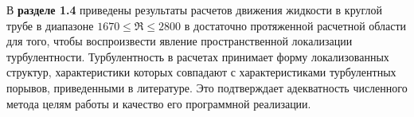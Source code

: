 В \textbf{разделе 1.4} приведены результаты расчетов движения жидкости в круглой трубе в диапазоне $1670 \leqslant \Re \leqslant 2800$ в достаточно протяженной расчетной области для того, чтобы воспроизвести явление пространственной локализации турбулентности. Турбулентность в расчетах принимает форму локализованных структур, характеристики которых совпадают с характеристиками турбулентных порывов, приведенными в литературе. Это подтверждает адекватность численного метода целям работы и качество его программной реализации. 




